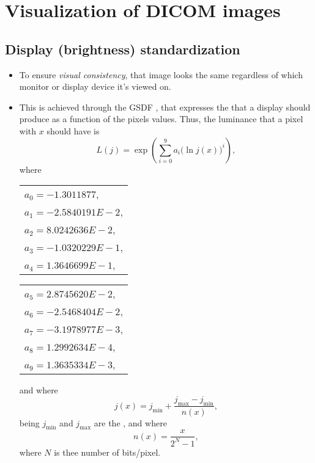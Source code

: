 \chapter{Visualization of \gls{DICOM} images}

\section{Display (brightness) standardization}
\begin{itemize}
\item To ensure \emph{visual consistency}, that image looks the same
  regardless of which monitor or display device it's viewed on.
\item This is achieved through the \gls{GSDF} \cite{DICOM_GSDF}, that
  expresses the  that a display
  should produce as a function of the pixels values. Thus, the
  luminance that a pixel with  $x$ should have is
  \begin{equation}
    L(j) = \exp\left(\sum_{i=0}^{9}a_i\big(\ln j(x)\big)^i\right),
  \end{equation}
  where
  \begin{center}
  \begin{tabular}{l}
    $a_0 = -1.3011877$, \\
    $a_1 = -2.5840191E-2$, \\
    $a_2 = 8.0242636E-2$, \\
    $a_3 = -1.0320229E-1$, \\
    $a_4 = 1.3646699E-1$, \\
  \end{tabular}
  \begin{tabular}{l}
    $a_5 = 2.8745620E-2$, \\
    $a_6 = -2.5468404E-2$,\\
    $a_7 = -3.1978977E-3$, \\
    $a_8 = 1.2992634E-4$, \\
    $a_9 = 1.3635334E-3$,
  \end{tabular}
  \end{center}
  and where
  \begin{equation}
    j(x) = j_{\text{min}} + \frac{j_{\text{max}} - j_{\text{min}}}{n(x)},
  \end{equation}
  being $j_{\text{min}}$ and $j_{\text{max}}$ are the , and where
  \begin{equation}
    n(x) = \frac{x}{2^N-1},
  \end{equation}
  where $N$ is thee number of bits/pixel.
\end{itemize}

